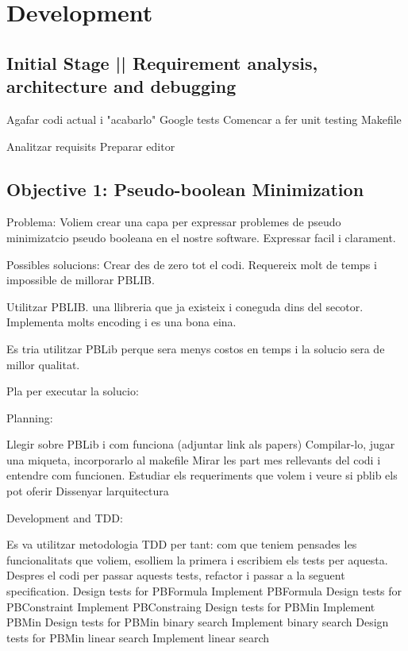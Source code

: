 \chapter{Development} 
\label{Chapter3}

\section{Initial Stage || Requirement analysis, architecture and debugging } %

Agafar codi actual i "acabarlo"
Google tests
Comencar a fer unit testing
Makefile

Analitzar requisits
Preparar editor


\section{Objective 1: Pseudo-boolean Minimization}

Problema:
Voliem crear una capa per expressar problemes de pseudo minimizatcio pseudo booleana en el nostre software. 
Expressar facil i clarament.

Possibles solucions:
Crear des de zero tot el codi. Requereix molt de temps i impossible de millorar PBLIB.

Utilitzar PBLIB. una llibreria que ja existeix i coneguda dins del secotor. Implementa molts encoding i es una bona eina.

Es tria utilitzar PBLib perque sera menys costos en temps i la solucio sera de millor qualitat.

Pla per executar la solucio:

Planning:

Llegir sobre PBLib i com funciona (adjuntar link als papers)
Compilar-lo, jugar una miqueta, incorporarlo al makefile
Mirar les part mes rellevants del codi i entendre com funcionen.
Estudiar els requeriments que volem i veure si pblib els pot oferir
Dissenyar larquitectura

Development and TDD:

Es va utilitzar metodologia TDD per tant:
com que teniem pensades les funcionalitats que voliem, esolliem la primera i escribiem els tests per aquesta. Despres el codi per passar aquests tests, refactor i passar a la seguent specification.
Design tests for PBFormula
Implement PBFormula
Design tests for PBConstraint
Implement PBConstraing
Design tests for PBMin
Implement PBMin
Design tests for PBMin binary search
Implement binary search
Design tests for PBMin linear search
Implement linear search

